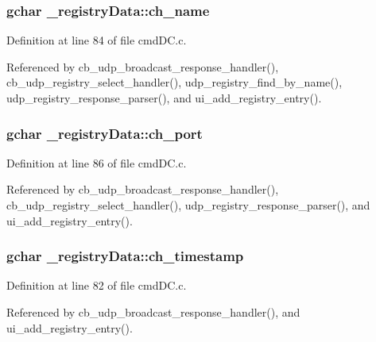 \subsubsection[{ch\+\_\+name}]{\setlength{\rightskip}{0pt plus 5cm}gchar \+\_\+registry\+Data\+::ch\+\_\+name}\label{struct__registry_data_a4764e2a72c3ba9177b6c4803cfa03f72}


Definition at line 84 of file cmd\+D\+C.\+c.



Referenced by cb\+\_\+udp\+\_\+broadcast\+\_\+response\+\_\+handler(), cb\+\_\+udp\+\_\+registry\+\_\+select\+\_\+handler(), udp\+\_\+registry\+\_\+find\+\_\+by\+\_\+name(), udp\+\_\+registry\+\_\+response\+\_\+parser(), and ui\+\_\+add\+\_\+registry\+\_\+entry().

\hypertarget{struct__registry_data_a74f03616af9ec9770266cb7988fe1a71}{}
\subsubsection[{ch\+\_\+port}]{\setlength{\rightskip}{0pt plus 5cm}gchar \+\_\+registry\+Data\+::ch\+\_\+port}\label{struct__registry_data_a74f03616af9ec9770266cb7988fe1a71}


Definition at line 86 of file cmd\+D\+C.\+c.



Referenced by cb\+\_\+udp\+\_\+broadcast\+\_\+response\+\_\+handler(), cb\+\_\+udp\+\_\+registry\+\_\+select\+\_\+handler(), udp\+\_\+registry\+\_\+response\+\_\+parser(), and ui\+\_\+add\+\_\+registry\+\_\+entry().

\hypertarget{struct__registry_data_a362a4edf89daafe79565053dd70892c4}{}
\subsubsection[{ch\+\_\+timestamp}]{\setlength{\rightskip}{0pt plus 5cm}gchar \+\_\+registry\+Data\+::ch\+\_\+timestamp}\label{struct__registry_data_a362a4edf89daafe79565053dd70892c4}


Definition at line 82 of file cmd\+D\+C.\+c.



Referenced by cb\+\_\+udp\+\_\+broadcast\+\_\+response\+\_\+handler(), and ui\+\_\+add\+\_\+registry\+\_\+entry().

